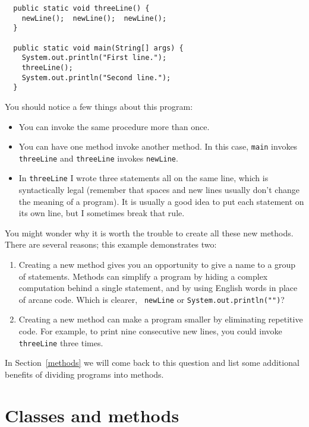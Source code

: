 \documentclass[12pt]{book}
\theoremstyle{definition}
\begin{document}
\begin{lstlisting}
  public static void threeLine() {
    newLine();  newLine();  newLine();
  }

  public static void main(String[] args) {
    System.out.println("First line.");
    threeLine();
    System.out.println("Second line.");
  }
\end{lstlisting}
%
You should notice a few things about this program:

\begin{itemize}

\item You can invoke the same procedure more than once.

\item You can have one method invoke another method.  In this
case, {\tt main} invokes {\tt threeLine} and {\tt threeLine}
invokes {\tt newLine}.

\item In {\tt threeLine} I wrote three statements all on the same
  line, which is syntactically legal (remember that spaces and new
  lines usually don't change the meaning of a program).  It is usually
  a good idea to put each statement on its own line, but I sometimes
  break that rule.

\end{itemize}

You might wonder why it is worth the trouble to
create all these new methods.  There are several
reasons; this example demonstrates two:

\begin{enumerate}

\item Creating a new method gives you an opportunity to
give a name to a group of statements.  Methods can simplify a program
by hiding a complex computation behind a single statement, and by using
English words in place of arcane code.  Which is clearer, {\tt
newLine} or {\tt System.out.println("")}?

\item Creating a new method can make a program smaller by eliminating
repetitive code.  For example, to print nine consecutive
new lines, you could invoke {\tt threeLine} three times.

\end{enumerate}

In Section~\ref{methods} we will come back to this question and list
some additional benefits of dividing programs into methods.


\section{Classes and methods}
\end{document}
